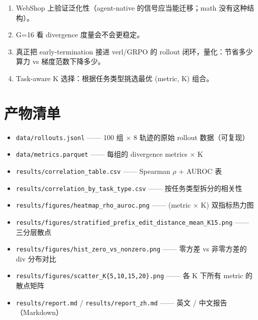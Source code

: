 \documentclass[11pt,a4paper]{article}
\begin{document}
\begin{enumerate}
  \item WebShop 上验证泛化性（agent-native 的信号应当能迁移；math 没有这种结构）。
  \item G=16 看 divergence 度量会不会更稳定。
  \item 真正把 early-termination 接进 verl/GRPO 的 rollout 闭环，量化：节省多少算力 vs 梯度范数下降多少。
  \item Task-aware K 选择：根据任务类型挑选最优 (metric, K) 组合。
\end{enumerate}

\section{产物清单}

\begin{itemize}
  \item \texttt{data/rollouts.jsonl} —— 100 组 $\times$ 8 轨迹的原始 rollout 数据（可复现）
  \item \texttt{data/metrics.parquet} —— 每组的 divergence metrics $\times$ K
  \item \texttt{results/correlation\_table.csv} —— Spearman $\rho$ + AUROC 表
  \item \texttt{results/correlation\_by\_task\_type.csv} —— 按任务类型拆分的相关性
  \item \texttt{results/figures/heatmap\_rho\_auroc.png} —— (metric $\times$ K) 双指标热力图
  \item \texttt{results/figures/stratified\_prefix\_edit\_distance\_mean\_K15.png} —— 三分层散点
  \item \texttt{results/figures/hist\_zero\_vs\_nonzero.png} —— 零方差 vs 非零方差的 div 分布对比
  \item \texttt{results/figures/scatter\_K\{5,10,15,20\}.png} —— 各 K 下所有 metric 的散点矩阵
  \item \texttt{results/report.md} / \texttt{results/report\_zh.md} —— 英文 / 中文报告（Markdown）
\end{itemize}
\end{document}
